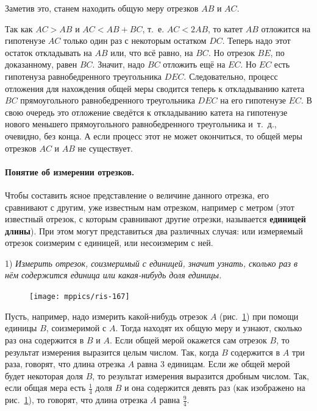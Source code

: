 \documentclass[oneside]{book}
\begin{document}
Заметив это, станем находить общую меру отрезков $AB$ и $AC$.

Так как $AC>AB$ и $AC<AB+BC$, т.~е.
$AC<2AB$, то катет $AB$ отложится на гипотенузе $AC$ только один раз с некоторым остатком $DC$.
Теперь надо этот остаток откладывать на $AB$ или, что всё равно, на $BC$.
Но отрезок $BE$, по доказанному, равен $BC$.
Значит, надо $BC$ отложить ещё на $EC$.
Но $EC$ есть гипотенуза равнобедренного треугольника $DEC$.
Следовательно, процесс отложения для нахождения общей меры сводится теперь к откладыванию катета $BC$ прямоугольного равнобедренного треугольника $DEC$ на его гипотенузе $EC$.
В свою очередь это отложение сведётся к откладыванию катета на гипотенузе нового меньшего прямоугольного равнобедренного треугольника и~т.~д., очевидно, без конца.
А если процесс этот не может окончиться, то общей меры отрезков $AC$ и $AB$ не существует.

\paragraph{Понятие об измерении отрезков.}\label{1938/150} %
Чтобы составить ясное представление о величине данного отрезка, его сравнивают с другим, уже известным нам отрезком, например с метром (этот известный отрезок, с которым сравнивают другие отрезки, называется \textbf{единицей длины}).
При этом могут представиться два различных случая:
или измеряемый отрезок соизмерим с единицей, или несоизмерим с ней.

1) \emph{Измерить отрезок, соизмеримый с единицей, значит узнать, сколько раз в нём содержится единица или какая-нибудь доля единицы.}

\begin{figure}
\centering
\texttt{[image: mppics/ris-167]}
\caption{}\label{1938/ris-167}
\end{figure}


Пусть, например, надо измерить какой-нибудь отрезок $A$ (рис.~\ref{1938/ris-167}) при помощи единицы $B$, соизмеримой с $A$.
Тогда находят их общую меру и узнают, сколько раз она содержится в $B$ и $A$.
Если общей мерой окажется сам отрезок $B$, то результат измерения выразится целым числом.
Так, когда $B$ содержится в $A$ три раза, говорят, что длина отрезка $A$ равна 3 единицам.
Если же общей мерой будет некоторая доля $B$, то результат измерения выразится дробным числом.
Так, если общая мера есть $\tfrac14$ доля $B$ и она содержится девять раз (как изображено на рис.~\ref{1938/ris-167}), то говорят, что длина отрезка $A$ равна $\tfrac94$.
\end{document}
